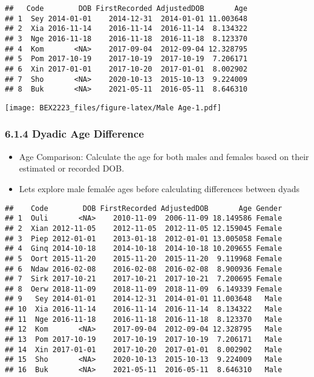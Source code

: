 \documentclass[
]{article}
\providecommand{\tightlist}{%
  \setlength{\itemsep}{0pt}\setlength{\parskip}{0pt}}
\begin{document}
\begin{verbatim}
##   Code        DOB FirstRecorded AdjustedDOB       Age
## 1  Sey 2014-01-01    2014-12-31  2014-01-01 11.003648
## 2  Xia 2016-11-14    2016-11-14  2016-11-14  8.134322
## 3  Nge 2016-11-18    2016-11-18  2016-11-18  8.123370
## 4  Kom       <NA>    2017-09-04  2012-09-04 12.328795
## 5  Pom 2017-10-19    2017-10-19  2017-10-19  7.206171
## 6  Xin 2017-01-01    2017-10-20  2017-01-01  8.002902
## 7  Sho       <NA>    2020-10-13  2015-10-13  9.224009
## 8  Buk       <NA>    2021-05-11  2016-05-11  8.646310
\end{verbatim}

\texttt{[image: BEX2223\_files/figure-latex/Male Age-1.pdf]}

\hypertarget{dyadic-age-difference}{%
\subsubsection{6.1.4 Dyadic Age
Difference}\label{dyadic-age-difference}}

\begin{itemize}
\tightlist
\item
  Age Comparison: Calculate the age for both males and females based on
  their estimated or recorded DOB.
\item
  Lets explore male femalée ages before calculating differences between
  dyads
\end{itemize}

\begin{verbatim}
##    Code        DOB FirstRecorded AdjustedDOB       Age Gender
## 1  Ouli       <NA>    2010-11-09  2006-11-09 18.149586 Female
## 2  Xian 2012-11-05    2012-11-05  2012-11-05 12.159045 Female
## 3  Piep 2012-01-01    2013-01-18  2012-01-01 13.005058 Female
## 4  Ginq 2014-10-18    2014-10-18  2014-10-18 10.209655 Female
## 5  Oort 2015-11-20    2015-11-20  2015-11-20  9.119968 Female
## 6  Ndaw 2016-02-08    2016-02-08  2016-02-08  8.900936 Female
## 7  Sirk 2017-10-21    2017-10-21  2017-10-21  7.200695 Female
## 8  Oerw 2018-11-09    2018-11-09  2018-11-09  6.149339 Female
## 9   Sey 2014-01-01    2014-12-31  2014-01-01 11.003648   Male
## 10  Xia 2016-11-14    2016-11-14  2016-11-14  8.134322   Male
## 11  Nge 2016-11-18    2016-11-18  2016-11-18  8.123370   Male
## 12  Kom       <NA>    2017-09-04  2012-09-04 12.328795   Male
## 13  Pom 2017-10-19    2017-10-19  2017-10-19  7.206171   Male
## 14  Xin 2017-01-01    2017-10-20  2017-01-01  8.002902   Male
## 15  Sho       <NA>    2020-10-13  2015-10-13  9.224009   Male
## 16  Buk       <NA>    2021-05-11  2016-05-11  8.646310   Male
\end{verbatim}
\end{document}
